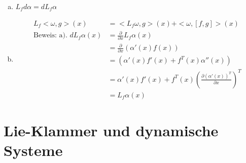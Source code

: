 \documentclass[ngerman]{tudscrreprt}
\begin{document}
\begin{enumerate}[(a)]
\item $L_f d \alpha = d L_f \alpha$
\item \begin{align*}L_f < \omega, g>(x) &= <L_f \omega, g>(x) + <\omega, [f,g]> (x)\\ 
\text{Beweis: a). } dL_f \alpha(x) &= \frac{\partial }{\partial x}L_f \alpha(x)\\ 
&= \frac{\partial}{\partial x}(\alpha' (x) f(x))\\ 
&= (\alpha'(x) f'(x) + f^T (x) \alpha''(x))\\ 
&= \alpha'(x) f'(x) + f^T (x) \left( \frac{\partial (\alpha'(x))^T}{\partial x} \right)^T\\ 
&= L_f\alpha(x)
\end{align*}
\end{enumerate}
\section{Lie-Klammer und dynamische Systeme}
\end{document}
